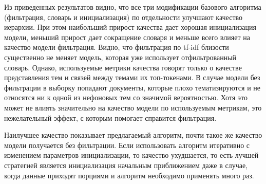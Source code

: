 Из приведенных результатов видно, что все три модификации базового алгоритма (фильтрация, словарь и инициализация) по отдельности улучшают качество иерархии. При этом наибольший прирост качества дает хорошая инициализация модели, меньший прирост дает сокращение словаря и меньше всего влияет на качество модели фильтрация. Видно, что фильтрация по tf-idf близости существенно не меняет модель, которая уже использует отфильтрованный словарь. Однако, используемые метрики качества говорят только о качестве представления тем и связей между темами их топ-токенами. В случае модели без фильтрации в выборку попадают документы, которые плохо тематизируются и не относятся ни к одной из нефоновых тем со значимой вероятностью. Хотя это может не влиять значительно на качество модели по используемым метрикам, это нежелательный эффект, с которым помогает справится фильтрация.  

Наилучшее качество показывает предлагаемый алгоритм, почти такое же качество модели получается без фильтрации. Если использовать алгоритм итеративно с изменением параметров инициализации, то качество ухудшается, то есть лучшей стратегией является инициализация начальным приближением даже в случае, когда данные приходят порциями и алгоритм необходимо применять много раз.


